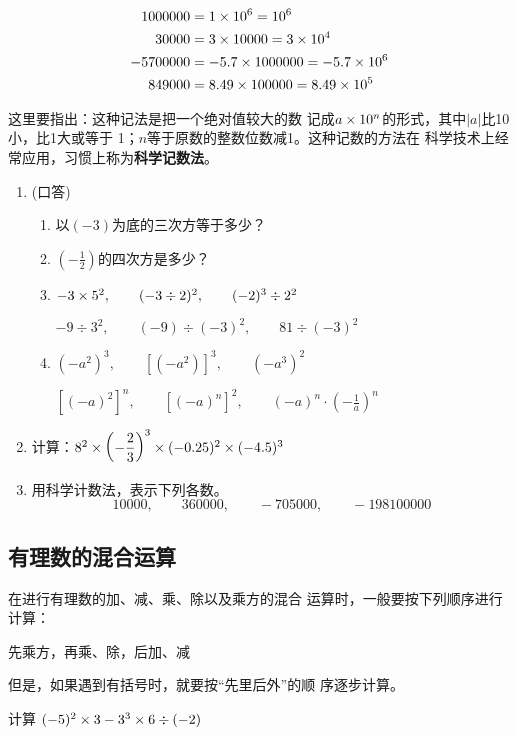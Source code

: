 \begin{solution}
	\[\begin{split}
	1000000 &=1\times 10^6=10^6\\ 
	30000  &=3\times 10000=3\times 10^4\\
	-5700000 &=-5.7\times 1000000=-5.7\times 10^6\\
	849000    &=8.49\times 100000=8.49\times 10^5
	\end{split}\]
\end{solution}

这里要指出：这种记法是把一个绝对值较大的数
记成$a\times10^n$的形式，其中$|a|$比10小，比1大或等于
1；$n$等于原数的整数位数减1。这种记数的方法在
科学技术上经常应用，习惯上称为\textbf{科学记数法}。


\begin{ex}
	\begin{enumerate}
		\item (口答)
		\begin{enumerate}
			\item 以$(- 3)$为底的三次方等于多少？
			\item $\left(-\frac{1}{2}\right)$的四次方是多少？
			\item $-3\times 5^2,\qquad (-3\div 2)^2,\qquad (-2)^3\div 2^2$
			
			$-9\div 3^2,\qquad (-9)\div (-3)^2,\qquad 81\div (-3)^2$
			\item $(-a^2)^3,\qquad [(-a^2)]^3,\qquad (-a^3)^2$
			
			$[(-a)^2]^n,\qquad [(-a)^n]^2,\qquad (-a)^n\cdot \left(-\frac{1}{a}\right)^n$
		\end{enumerate}   
		\item 计算：$8^2\times \left(-\dfrac{2}{3}\right)^3\times(-0.25)^2\times (-4.5)^3$
		\item 用科学计数法，表示下列各数。
		\[10000,\qquad 360000,\qquad -705000,\qquad -198100000  \]
	\end{enumerate}
\end{ex}

\subsection{有理数的混合运算}
在进行有理数的加、减、乘、除以及乘方的混合
运算时，一般要按下列顺序进行计算：
\begin{center}
	先乘方，再乘、除，后加、减  
\end{center}
但是，如果遇到有括号时，就要按“先里后外”的顺
序逐步计算。




\begin{example}
	计算 $(-5)^2\times 3-3^3\times 6\div (-2)$
\end{example}


